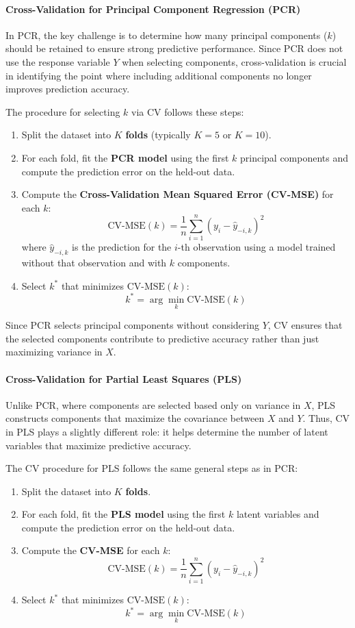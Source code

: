 \documentclass[11pt,twoside,a4paper]{article}
\begin{document}
\paragraph{Cross-Validation for Principal Component Regression (PCR)}
In PCR, the key challenge is to determine how many principal components (\( k \)) should be retained to ensure strong predictive performance. Since PCR does not use the response variable \( Y \) when selecting components, cross-validation is crucial in identifying the point where including additional components no longer improves prediction accuracy.

The procedure for selecting \( k \) via CV follows these steps:
\begin{enumerate}
    \item Split the dataset into \( K \) \textbf{folds} (typically \( K = 5 \) or \( K = 10 \)).
    \item For each fold, fit the \textbf{PCR model} using the first \( k \) principal components and compute the prediction error on the held-out data.
    \item Compute the \textbf{Cross-Validation Mean Squared Error (CV-MSE)} for each \( k \):
    \[
    \text{CV-MSE}(k) = \frac{1}{n} \sum_{i=1}^{n} (y_i - \hat{y}_{-i,k})^2
    \]
    where \( \hat{y}_{-i,k} \) is the prediction for the \( i \)-th observation using a model trained without that observation and with \( k \) components.
    \item Select \( k^* \) that minimizes \(\text{CV-MSE}(k)\):
    \[
    k^* = \arg\min_k \text{CV-MSE}(k)
    \]
\end{enumerate}

Since PCR selects principal components without considering \( Y \), CV ensures that the selected components contribute to predictive accuracy rather than just maximizing variance in \( X \).

\paragraph{Cross-Validation for Partial Least Squares (PLS)}
Unlike PCR, where components are selected based only on variance in \( X \), PLS constructs components that maximize the covariance between \( X \) and \( Y \). Thus, CV in PLS plays a slightly different role: it helps determine the number of latent variables that maximize predictive accuracy.

The CV procedure for PLS follows the same general steps as in PCR:
\begin{enumerate}
    \item Split the dataset into \( K \) \textbf{folds}.
    \item For each fold, fit the \textbf{PLS model} using the first \( k \) latent variables and compute the prediction error on the held-out data.
    \item Compute the \textbf{CV-MSE} for each \( k \):
    \[
    \text{CV-MSE}(k) = \frac{1}{n} \sum_{i=1}^{n} (y_i - \hat{y}_{-i,k})^2
    \]
    \item Select \( k^* \) that minimizes \(\text{CV-MSE}(k)\):
    \[
    k^* = \arg\min_k \text{CV-MSE}(k)
    \]
\end{enumerate}
\end{document}
